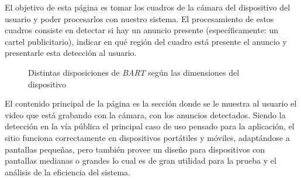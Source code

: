 \documentclass[a4paper]{article}
\begin{document}
El objetivo de esta página es tomar los cuadros de la cámara del dispositivo del usuario y poder procesarlos con nuestro sistema. El procesamiento de estos cuadros consiste en detectar si hay un anuncio presente (específicamente: un cartel publicitario), indicar en qué región del cuadro está presente el anuncio y presentarle esta detección al usuario.

\begin{figure}[H]
\caption{Distintas disposiciones de \textit{BART} según las dimensiones del dispositivo}
\end{figure}

El contenido principal de la página es la sección donde se le muestra al usuario el video que está grabando con la cámara, con los anuncios detectados. Siendo la detección en la vía pública el principal caso de uso pensado para la aplicación, el sitio funciona correctamente en dispositivos portátiles y móviles, adaptándose a pantallas pequeñas, pero también provee un diseño para dispositivos con pantallas medianas o grandes lo cual es de gran utilidad para la prueba y el análisis de la eficiencia del sistema.
\end{document}
